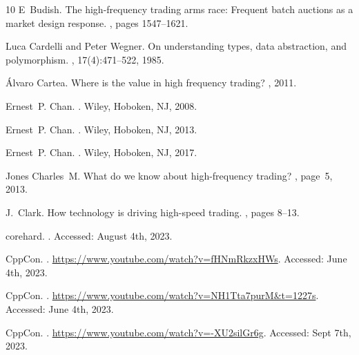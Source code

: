 \documentclass{article}
\theoremstyle{break}
\begin{document}
\begin{thebibliography}{10}
E~Budish.
\newblock The high-frequency trading arms race: Frequent batch auctions as a market design response.
, pages 1547--1621.

Luca Cardelli and Peter Wegner.
\newblock On understanding types, data abstraction, and polymorphism.
, 17(4):471--522, 1985.

Álvaro Cartea.
\newblock Where is the value in high frequency trading?
, 2011.

Ernest~P. Chan.
.
\newblock Wiley, Hoboken, NJ, 2008.

Ernest~P. Chan.
.
\newblock Wiley, Hoboken, NJ, 2013.

Ernest~P. Chan.
.
\newblock Wiley, Hoboken, NJ, 2017.

Jones Charles~M.
\newblock What do we know about high-frequency trading?
, page~5, 2013.

J.~Clark.
\newblock How technology is driving high-speed trading.
, pages 8--13.

{corehard}.
.
\newblock Accessed: August 4th, 2023.

{CppCon}.
.
\newblock \url{https://www.youtube.com/watch?v=fHNmRkzxHWs}.
\newblock Accessed: June 4th, 2023.

{CppCon}.
.
\newblock \url{https://www.youtube.com/watch?v=NH1Tta7purM&t=1227s}.
\newblock Accessed: June 4th, 2023.

{CppCon}.
.
\newblock \url{https://www.youtube.com/watch?v=-XU2silGr6g}.
\newblock Accessed: Sept 7th, 2023.


\end{thebibliography}
\end{document}
